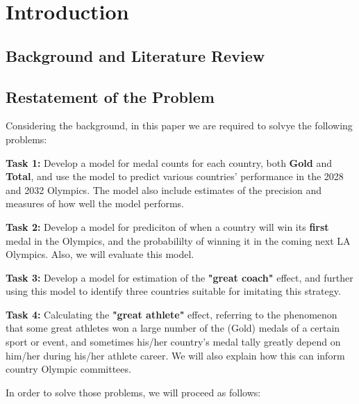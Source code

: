 \section{Introduction}

\subsection{Background and Literature Review}

\subsection{Restatement of the Problem}
Considering the background, in this paper we are required to solvye the following problems:

\textbf{Task 1:} Develop a model for medal counts for each country, both \textbf{Gold} and \textbf{Total}, and use the model to predict various countries' performance in the 2028 and 2032 Olympics. The model also include estimates of the precision and measures of how well the model performs.

\textbf{Task 2:} Develop a model for prediciton of when a country will win its \textbf{first} medal in the Olympics, and the probabililty of winning it in the coming next LA Olympics. Also, we will evaluate this model.

\textbf{Task 3:} Develop a model for estimation of the \textbf{"great coach"} effect, and further using this model to identify three countries suitable for imitating this strategy.

\textbf{Task 4:} Calculating the \textbf{"great athlete"} effect, referring to the phenomenon that some great athletes won a large number of the (Gold) medals of a certain sport or event, and sometimes his/her country's medal tally greatly depend on him/her during his/her athlete career. We will also explain how this can inform country Olympic committees.


In order to solve those problems, we will proceed as follows:

